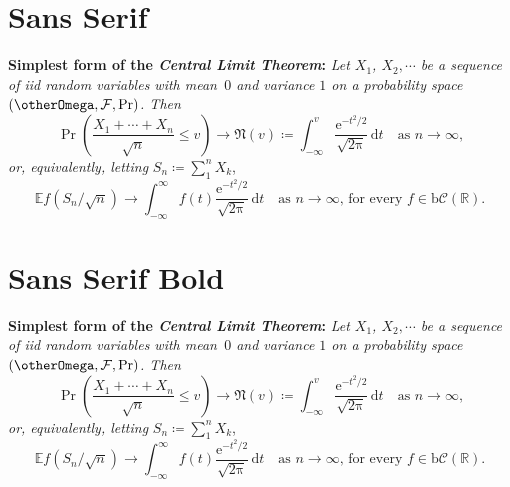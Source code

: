 \documentclass{article}
\let \Gamma   \otherGamma
\let \Delta   \otherDelta
\let \Theta   \otherTheta
\let \Lambda  \otherLambda
\let \Xi      \otherXi
\let \Pi      \otherPi
\let \Sigma   \otherSigma
\let \Upsilon \otherUpsilon
\let \Phi     \otherPhi
\let \Psi     \otherPsi
\let \Omega   \otherOmega
\newif\IfInSansMode
\newif\IfInBoldMode
\newcommand{\omicron}{o}
\newcommand{\Digamma}{F}
\newcommand{\Alpha}  {A}
\newcommand{\Beta}   {B}
\newcommand{\Epsilon}{E}
\newcommand{\Zeta}   {Z}
\newcommand{\Eta}    {H}
\newcommand{\Iota}   {I}
\newcommand{\Kappa}  {K}
\newcommand{\Mu}     {M}
\newcommand{\Nu}     {N}
\newcommand{\Omicron}{O}
\newcommand{\Rho}    {P}
\newcommand{\Tau}    {T}
\newcommand{\Chi}    {X}
\newcommand{\renewgreekletters}{%
	\renewcommand{\Alpha}   {\textit{\fontencoding{LGR}\selectfont A}}
	\renewcommand{\Beta}    {\textit{\fontencoding{LGR}\selectfont B}}
	\renewcommand{\Gamma}   {\textit{\fontencoding{LGR}\selectfont G}}
	\renewcommand{\Delta}   {\textit{\fontencoding{LGR}\selectfont D}}
	\renewcommand{\Epsilon} {\textit{\fontencoding{LGR}\selectfont E}}
	\renewcommand{\Zeta}    {\textit{\fontencoding{LGR}\selectfont Z}}
	\renewcommand{\Eta}     {\textit{\fontencoding{LGR}\selectfont H}}
	\renewcommand{\Theta}   {\textit{\fontencoding{LGR}\selectfont J}}
	\renewcommand{\Iota}    {\textit{\fontencoding{LGR}\selectfont I}}
	\renewcommand{\Kappa}   {\textit{\fontencoding{LGR}\selectfont K}}
	\renewcommand{\Lambda}  {\textit{\fontencoding{LGR}\selectfont L}}
	\renewcommand{\Mu}      {\textit{\fontencoding{LGR}\selectfont M}}
	\renewcommand{\Nu}      {\textit{\fontencoding{LGR}\selectfont N}}
	\renewcommand{\Xi}      {\textit{\fontencoding{LGR}\selectfont X}}
	\renewcommand{\Omicron} {\textit{\fontencoding{LGR}\selectfont O}}
	\renewcommand{\Pi}      {\textit{\fontencoding{LGR}\selectfont P}}
	\renewcommand{\Rho}     {\textit{\fontencoding{LGR}\selectfont R}}
	\renewcommand{\Sigma}   {\textit{\fontencoding{LGR}\selectfont S}}
	\renewcommand{\Tau}     {\textit{\fontencoding{LGR}\selectfont T}}
	\renewcommand{\Upsilon} {\textit{\fontencoding{LGR}\selectfont U}}
	\renewcommand{\Phi}     {\textit{\fontencoding{LGR}\selectfont F}}
	\renewcommand{\Chi}     {\textit{\fontencoding{LGR}\selectfont Q}}
	\renewcommand{\Psi}     {\textit{\fontencoding{LGR}\selectfont Y}}
	\renewcommand{\Omega}   {\textit{\fontencoding{LGR}\selectfont W}}
	\renewcommand{\Digamma} {\textit{\fontencoding{LGR}\selectfont \char195}}
	\renewcommand{\alpha}   {\textit{\fontencoding{LGR}\selectfont a}}
	\renewcommand{\beta}    {\textit{\fontencoding{LGR}\selectfont b}}
	\renewcommand{\gamma}   {\textit{\fontencoding{LGR}\selectfont g}}
	\renewcommand{\delta}   {\textit{\fontencoding{LGR}\selectfont d}}
	\renewcommand{\epsilon} {\textit{\fontencoding{LGR}\selectfont e}}
	\renewcommand{\zeta}    {\textit{\fontencoding{LGR}\selectfont z}}
	\renewcommand{\eta}     {\textit{\fontencoding{LGR}\selectfont h}}
	\renewcommand{\theta}   {\textit{\fontencoding{LGR}\selectfont j}}
	\renewcommand{\iota}    {\textit{\fontencoding{LGR}\selectfont i}}
	\renewcommand{\kappa}   {\textit{\fontencoding{LGR}\selectfont k}}
	\renewcommand{\lambda}  {\textit{\fontencoding{LGR}\selectfont l}}
	\renewcommand{\mu}      {\textit{\fontencoding{LGR}\selectfont m}}
	\renewcommand{\nu}      {\textit{\fontencoding{LGR}\selectfont n}}
	\renewcommand{\xi}      {\textit{\fontencoding{LGR}\selectfont x}}
	\renewcommand{\omicron} {\textit{\fontencoding{LGR}\selectfont o}}
	\renewcommand{\pi}      {\textit{\fontencoding{LGR}\selectfont p}}
	\renewcommand{\rho}     {\textit{\fontencoding{LGR}\selectfont r}}
	\renewcommand{\sigma}   {\textit{\fontencoding{LGR}\selectfont s}}
	\renewcommand{\varsigma}{\textit{\fontencoding{LGR}\selectfont c}}
	\renewcommand{\tau}     {\textit{\fontencoding{LGR}\selectfont t}}
	\renewcommand{\upsilon} {\textit{\fontencoding{LGR}\selectfont u}}
	\renewcommand{\phi}     {\textit{\fontencoding{LGR}\selectfont f}}
	\renewcommand{\chi}     {\textit{\fontencoding{LGR}\selectfont q}}
	\renewcommand{\psi}     {\textit{\fontencoding{LGR}\selectfont y}}
	\renewcommand{\omega}   {\textit{\fontencoding{LGR}\selectfont w}}
	\renewcommand{\digamma} {\textit{\fontencoding{LGR}\selectfont \char147}}
}
\renewcommand{\renewgreekletters}{}
\begin{document}
\section{Sans Serif}

\sffamily\mdseries{}%
\renewgreekletters%
\blindmathpaper

%
\textbf{Simplest form of the \textit{Central Limit Theorem}:} \textit{Let
$X_1$, $X_2,\cdots$ be a sequence of iid random variables with mean~$0$ 
and variance $1$ on a probability space $(\Omega,\mathcal{F},\Pr)$. Then}
\[\Pr\left(\frac{X_1+\cdots+X_n}{\sqrt{n}}\le v\right)\to\mathfrak{N}(v)\coloneq
\int_{-\infty}^v \frac{\mathrm{e}^{-t^2/2}}{\sqrt{2\mathup{\pi}}}\,
\mathrm{d}t\quad\mbox{as $n\to\infty$,}\]
\textit{or, equivalently, letting} $S_n\coloneq\sum_1^n X_k$,
\[\mathbb{E} f\left(S_n/\sqrt{n}\right)\to \int_{-\infty}^\infty f(t)
\frac{\mathrm{e}^{-t^2/2}}{\sqrt{2\mathup{\pi}}}\,\mathrm{d}t
\quad\mbox{as $n\to\infty$, for every $f\in\mathrm{b}
\mathcal{C}(\mathbb{R})$.}\]

\blindmathpaper


\section{Sans Serif Bold}

\sffamily\bfseries{}
\renewgreekletters%
\blindmathpaper

\textbf{Simplest form of the \textit{Central Limit Theorem}:} \textit{Let
$X_1$, $X_2,\cdots$ be a sequence of iid random variables with mean~$0$ 
and variance $1$ on a probability space $(\Omega,\mathcal{F},\Pr)$. Then}
\[\Pr\left(\frac{X_1+\cdots+X_n}{\sqrt{n}}\le v\right)\to\mathfrak{N}(v)\coloneq
\int_{-\infty}^v \frac{\mathrm{e}^{-t^2/2}}{\sqrt{2\mathup{\pi}}}\,
\mathrm{d}t\quad\mbox{as $n\to\infty$,}\]
\textit{or, equivalently, letting} $S_n\coloneq\sum_1^n X_k$,
\[\mathbb{E} f\left(S_n/\sqrt{n}\right)\to \int_{-\infty}^\infty f(t)
\frac{\mathrm{e}^{-t^2/2}}{\sqrt{2\mathup{\pi}}}\,\mathrm{d}t
\quad\mbox{as $n\to\infty$, for every $f\in\mathrm{b}
\mathcal{C}(\mathbb{R})$.}\]

\blindmathpaper


%
%
%
\end{document}
